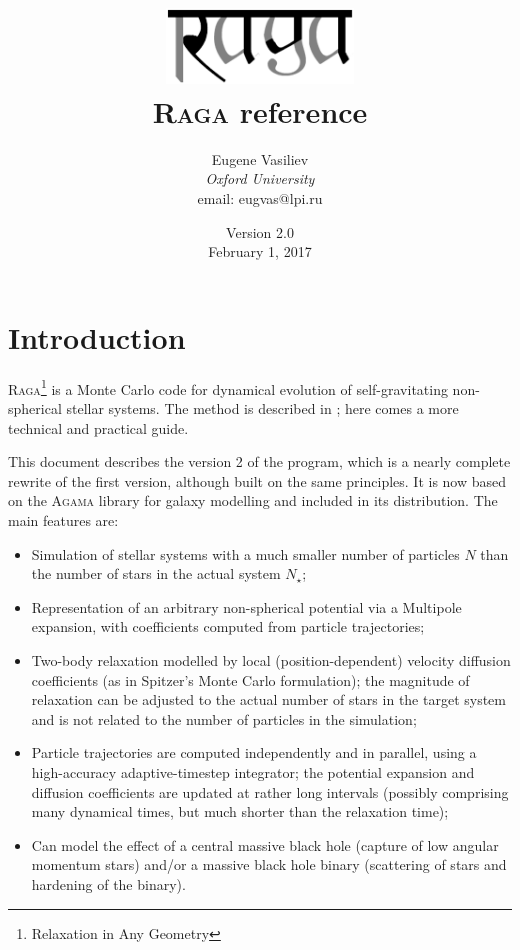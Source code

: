 \documentclass[12pt]{article}
\newcommand{\Raga}{\textsc{Raga}\xspace}
\newcommand{\Agama}{\textsc{Agama}\xspace}
\begin{document}
\title{
\includegraphics[width=5cm]{raga} \protect\\[1cm]
\protect\Raga reference}
\author{Eugene Vasiliev\\
\normalsize\textit{Oxford University}\\
\normalsize\textrm{email: eugvas@lpi.ru} }

\date{Version 2.0\\ February 1, 2017}

\maketitle
\tableofcontents

\section{Introduction}
\Raga\footnote{Relaxation in Any Geometry}
is a Monte Carlo code for dynamical evolution of self-gravitating non-spherical stellar systems.
The method is described in \cite{Vasiliev2015}; here comes a more technical and practical guide.

This document describes the version 2 of the program, which is a nearly complete rewrite of the first version, although built on the same principles. It is now based on the \Agama library for galaxy modelling \cite{Vasiliev2017} and included in its distribution. The main features are:
\begin{itemize}
\item Simulation of stellar systems with a much smaller number of particles $N$ than the number of stars in the actual system $N_\star$;
\item Representation of an arbitrary non-spherical potential via a Multipole expansion, with coefficients computed from particle trajectories;
\item Two-body relaxation modelled by local (position-dependent) velocity diffusion coefficients (as in Spitzer's Monte Carlo formulation); the magnitude of relaxation can be adjusted to the actual number of stars in the target system and is not related to the number of particles in the simulation;
\item Particle trajectories are computed independently and in parallel, using a high-accuracy adaptive-timestep integrator; the potential expansion and diffusion coefficients are updated at rather long intervals (possibly comprising many dynamical times, but much shorter than the relaxation time);
\item Can model the effect of a central massive black hole (capture of low angular momentum stars) and/or a massive black hole binary (scattering of stars and hardening of the binary).
\end{itemize}
\end{document}
